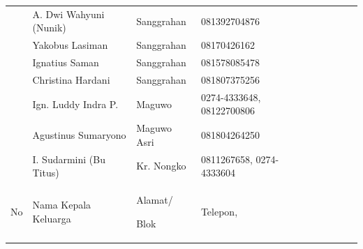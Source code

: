 \documentclass{article}
\begin{document}
\begin{flushleft}
\begin{supertabular}{|m{0.79800004cm}|m{3.5609999cm}|m{2.179cm}|m{2.658cm}|m{0.753cm}|m{-0.04100001cm}|m{0.689cm}|m{-0.04100001cm}|m{0.753cm}|}
 &
A. Dwi Wahyuni (Nunik) &
Sanggrahan &
081392704876 &
 &
 &
\\
 &
Yakobus Lasiman &
Sanggrahan &
08170426162 &
 &
 &
\\
 &
Ignatius Saman &
Sanggrahan &
081578085478 &
 &
 &
\\
 &
Christina Hardani &
Sanggrahan &
081807375256 &
 &
 &
\\
 &
Ign. Luddy Indra P. &
Maguwo &
0274-4333648, 08122700806 &
 &
 &
\\
 &
Agustinus Sumaryono &
Maguwo Asri &
081804264250 &
 &
 &
\\
 &
I. Sudarmini (Bu Titus) &
Kr. Nongko &
0811267658, 0274-4333604 &
 &
 &
\\
\centering No &
\centering Nama Kepala Keluarga &
\centering Alamat/ \par

\centering Blok &
\centering Telepon,\par


\end{supertabular}
\end{flushleft}
\end{document}
